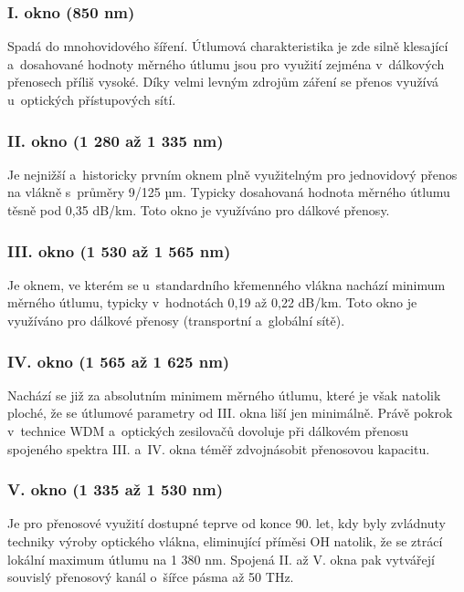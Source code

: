 \subsubsection{I. okno (850 nm)}
Spadá do mnohovidového šíření. Útlumová charakteristika je zde silně klesající a~dosahované hodnoty měrného útlumu jsou pro využití zejména v~dálkových přenosech příliš vysoké. Díky velmi levným zdrojům záření se přenos využívá u~optických přístupových sítí.

\subsubsection{II. okno (1 280 až 1 335 nm)}
Je nejnižší a~historicky prvním oknem plně využitelným pro jednovidový přenos na vlákně s~průměry 9/125 µm. Typicky dosahovaná hodnota měrného útlumu těsně pod 0,35 dB/km. Toto okno je využíváno pro dálkové přenosy.

\subsubsection{III. okno (1 530 až 1 565 nm)}
Je oknem, ve kterém se u~standardního křemenného vlákna nachází minimum měrného útlumu, typicky v~hodnotách 0,19 až 0,22 dB/km. Toto okno je využíváno pro dálkové přenosy (transportní a~globální sítě).

\subsubsection{IV. okno (1 565 až 1 625 nm)}
Nachází se již za absolutním minimem měrného útlumu, které je však natolik ploché, že se útlumové parametry od III. okna liší jen minimálně. Právě pokrok v~technice WDM a~optických zesilovačů dovoluje při dálkovém přenosu spojeného spektra III. a~IV. okna téměř zdvojnásobit přenosovou kapacitu.

\subsubsection{V. okno (1 335 až 1 530 nm)}
Je pro přenosové využití dostupné teprve od konce 90. let, kdy byly zvládnuty techniky výroby optického vlákna, eliminující příměsi OH natolik, že se ztrácí lokální maximum útlumu na 1 380 nm. Spojená II. až V. okna pak vytvářejí souvislý přenosový kanál o~šířce pásma až 50 THz.

